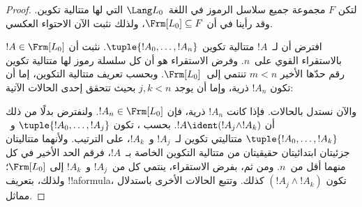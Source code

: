 \documentclass[../../../include/open-logic-section]{subfiles}
\begin{document}
\begin{proof}
لتكن $F$ مجموعة جميع سلاسل الرموز في اللغة~$\Lang L_0$ التي لها
متتالية تكوين. وقد رأينا في  أن
$\Frm[L_0] \subseteq F$، ولذلك نثبت الآن الاحتواء العكسي.

افترض أن لـ~$!A$ متتالية تكوين $\tuple{!A_0,\dotsc,!A_n}$.
نثبت أن $!A \in \Frm[L_0]$ بالاستقراء القوي على~$n$.
وفرض الاستقراء هو أن كل سلسلة رموز لها متتالية تكوين رقم حدّها الأخير
$m < n$ تنتمي إلى~$\Frm[L_0]$. وبحسب تعريف متتالية التكوين، إما أن
تكون $!A_n$ ذرية، وإما أن يوجد $j,k < n$ بحيث تتحقق إحدى الحالات
الآتية:
\begin{enumerate}
\end{enumerate}
والآن نستدل بالحالات. فإذا كانت $!A_n$ ذرية، فإن
$!A_n \in \Frm[L_0]$. ولنفترض بدلًا من ذلك أن $!A \ident
(!A_j \land !A_k)$. بحسب ، تكون
$\tuple{!A_0,\dotsc,!A_j}$ و~$\tuple{!A_0,\dotsc,!A_k}$ متتاليتي
تكوين لـ~$!A_j$ و~$!A_k$، على الترتيب. ولأنهما متتاليتان جزئيتان
ابتدائيتان حقيقيتان من متتالية التكوين الخاصة بـ~$!A$، فرقم الحد الأخير في كل منهما
أقل من~$n$. ومن ثم، بفرض الاستقراء، ينتمي كل من~$!A_j$ و~$!A_k$ إلى
$\Frm[L_0]$؛ ولذلك، بتعريف !!a{formula}، تكون
$(!A_j \land !A_k)$ كذلك. وتتبع الحالات الأخرى باستدلال مماثل.
\end{proof}
\end{document}
